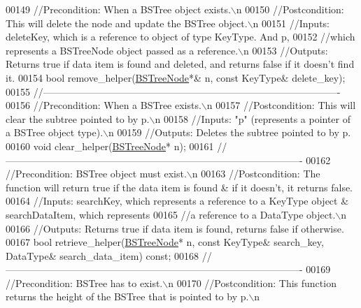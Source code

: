 \begin{DoxyCode}
00149     \textcolor{comment}{//Precondition: When a BSTree object exists.\(\backslash\)n}
00150     \textcolor{comment}{//Postcondition: This will delete the node and update the BSTree object.\(\backslash\)n}
00151     \textcolor{comment}{//Inputs: deleteKey, which is a reference to object of type KeyType. And p, }
00152     \textcolor{comment}{//which represents a BSTreeNode object passed as a reference.\(\backslash\)n}
00153     \textcolor{comment}{//Outputs: Returns true if data item is found and deleted, and returns false if it doesn't find it.}
00154     \textcolor{keywordtype}{bool} remove\_helper(\hyperlink{class_b_s_tree_1_1_b_s_tree_node}{BSTreeNode}*& n, \textcolor{keyword}{const} KeyType& delete\_key);
00155     \textcolor{comment}{//-------------------------------------------------------------------------------------------}
00156     \textcolor{comment}{//Precondition: When a BSTree exists.\(\backslash\)n}
00157     \textcolor{comment}{//Postcondition: This will clear the subtree pointed to by p.\(\backslash\)n}
00158     \textcolor{comment}{//Inputs: "p" (represents a pointer of a BSTree object type).\(\backslash\)n}
00159     \textcolor{comment}{//Outputs: Deletes the subtree pointed to by p.}
00160     \textcolor{keywordtype}{void} clear\_helper(\hyperlink{class_b_s_tree_1_1_b_s_tree_node}{BSTreeNode}* n);
00161     \textcolor{comment}{//-------------------------------------------------------------------------------------------}
00162     \textcolor{comment}{//Precondition: BSTree object must exist.\(\backslash\)n}
00163     \textcolor{comment}{//Postcondition: The function will return true if the data item is found & if it doesn't, it returns
       false.}
00164     \textcolor{comment}{//Inputs: searchKey, which represents a reference to a KeyType object & searchDataItem, which
       represents}
00165     \textcolor{comment}{//a reference to a DataType object.\(\backslash\)n}
00166     \textcolor{comment}{//Outputs: Returns true if data item is found, returns false if otherwise.}
00167     \textcolor{keywordtype}{bool} retrieve\_helper(\hyperlink{class_b_s_tree_1_1_b_s_tree_node}{BSTreeNode}* n, \textcolor{keyword}{const} KeyType& search\_key, DataType& search\_data\_item) \textcolor{keyword}{
      const};
00168     \textcolor{comment}{//-------------------------------------------------------------------------------------------}
00169     \textcolor{comment}{//Precondition: BSTree has to exist.\(\backslash\)n}
00170     \textcolor{comment}{//Postcondition: This function returns the height of the BSTree that is pointed to by p.\(\backslash\)n}

\end{DoxyCode}
